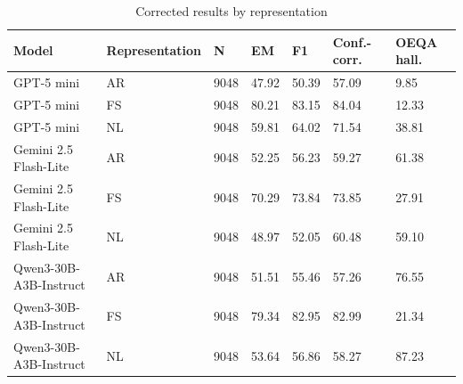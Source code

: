 \begin{table}[t]
\centering
\small
\begin{tabular}{lllllll}
\toprule
Model & Representation & N & EM & F1 & Conf.-corr. & OEQA hall. \\
\midrule
GPT-5 mini & AR & 9048 & 47.92 & 50.39 & 57.09 & 9.85 \\
GPT-5 mini & FS & 9048 & 80.21 & 83.15 & 84.04 & 12.33 \\
GPT-5 mini & NL & 9048 & 59.81 & 64.02 & 71.54 & 38.81 \\
Gemini 2.5 Flash-Lite & AR & 9048 & 52.25 & 56.23 & 59.27 & 61.38 \\
Gemini 2.5 Flash-Lite & FS & 9048 & 70.29 & 73.84 & 73.85 & 27.91 \\
Gemini 2.5 Flash-Lite & NL & 9048 & 48.97 & 52.05 & 60.48 & 59.10 \\
Qwen3-30B-A3B-Instruct & AR & 9048 & 51.51 & 55.46 & 57.26 & 76.55 \\
Qwen3-30B-A3B-Instruct & FS & 9048 & 79.34 & 82.95 & 82.99 & 21.34 \\
Qwen3-30B-A3B-Instruct & NL & 9048 & 53.64 & 56.86 & 58.27 & 87.23 \\
\bottomrule
\end{tabular}
\caption{Corrected results by representation}
\label{tab:core-v11-corrected-results-by-representation}
\end{table}
